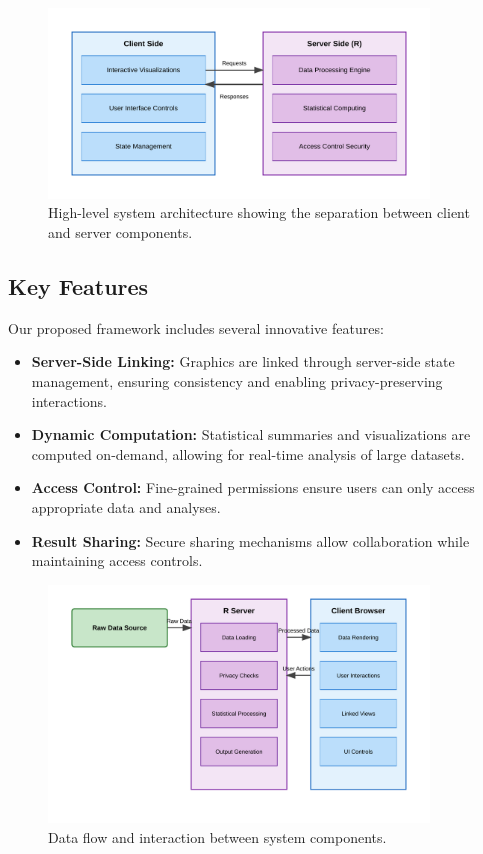 \documentclass{article}
\begin{document}
\begin{figure}[H]
    \centering
    \includegraphics[width=0.9\textwidth]{system-architecture.pdf}
    \caption{High-level system architecture showing the separation between client and server components.}
    \label{fig:system-architecture}
\end{figure}

\subsection{Key Features}
Our proposed framework includes several innovative features:

\begin{itemize}
\item \textbf{Server-Side Linking:} Graphics are linked through server-side state management, ensuring consistency and enabling privacy-preserving interactions.

\item \textbf{Dynamic Computation:} Statistical summaries and visualizations are computed on-demand, allowing for real-time analysis of large datasets.

\item \textbf{Access Control:} Fine-grained permissions ensure users can only access appropriate data and analyses.

\item \textbf{Result Sharing:} Secure sharing mechanisms allow collaboration while maintaining access controls.
\end{itemize}

\begin{figure}[H]
    \centering
    \includegraphics[width=0.9\textwidth]{data-flow.pdf}
    \caption{Data flow and interaction between system components.}
    \label{fig:data-flow}
\end{figure}
\end{document}
